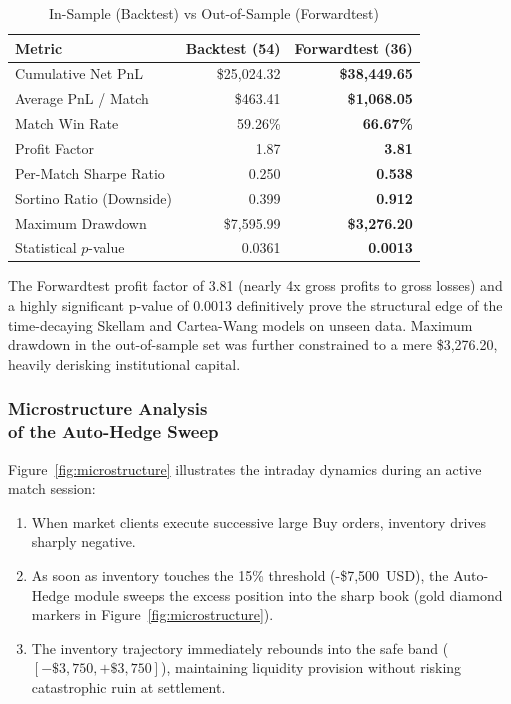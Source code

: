 \documentclass[10pt,twocolumn]{article}
\begin{document}
\begin{table}[H]
\centering
\caption{In-Sample (Backtest) vs Out-of-Sample (Forwardtest)}
\label{tab:validation}
\footnotesize
\setlength{\tabcolsep}{2.0pt}
\begin{tabular}{lrr}
\toprule
\textbf{Metric} & \textbf{Backtest (54)} & \textbf{Forwardtest (36)} \\
\midrule
Cumulative Net PnL & \$25,024.32 & \textbf{\$38,449.65} \\
Average PnL / Match & \$463.41 & \textbf{\$1,068.05} \\
Match Win Rate & 59.26\% & \textbf{66.67\%} \\
Profit Factor & 1.87 & \textbf{3.81} \\
Per-Match Sharpe Ratio & 0.250 & \textbf{0.538} \\
Sortino Ratio (Downside) & 0.399 & \textbf{0.912} \\
Maximum Drawdown & \$7,595.99 & \textbf{\$3,276.20} \\
Statistical $p$-value & 0.0361 & \textbf{0.0013} \\
\bottomrule
\end{tabular}
\end{table}

The Forwardtest profit factor of 3.81 (nearly 4x gross profits to gross losses) and a highly significant p-value of 0.0013 definitively prove the structural edge of the time-decaying Skellam and Cartea-Wang models on unseen data. Maximum drawdown in the out-of-sample set was further constrained to a mere \$3,276.20, heavily derisking institutional capital.

\subsubsection[Microstructure Analysis of the Auto-Hedge Sweep]{Microstructure Analysis \\ of the Auto-Hedge Sweep}
Figure~\ref{fig:microstructure} illustrates the intraday dynamics during an active match session:
\begin{enumerate}
    \item When market clients execute successive large Buy orders, inventory drives sharply negative.
    \item As soon as inventory touches the 15\% threshold (-\$7,500~USD), the Auto-Hedge module sweeps the excess position into the sharp book (gold diamond markers in Figure~\ref{fig:microstructure}).
    \item The inventory trajectory immediately rebounds into the safe band ($[-\$3,750, +\$3,750]$), maintaining liquidity provision without risking catastrophic ruin at settlement.
\end{enumerate}
\end{document}
